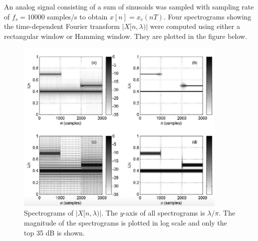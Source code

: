 \documentclass[12pt]{report}
\begin{document}
\newpage
{} 

An analog signal consisting of a sum of sinusoids was sampled with sampling rate of $f_s = 10000$ samples/s to obtain $x[n] = x_c(nT)$. Four spectrograms showing the time-dependent Fourier transform $|X[n, \lambda)|$ were computed using either a rectangular window or Hamming window. They are plotted in the figure below. 
\vspace{-0.3cm}
\begin{figure}[h!]
	\centering
	\includegraphics[width=0.9\textwidth]{figs/spectrograms.png}
	\caption{Spectrograms of $|X[n, \lambda)|$. The $y$-axis of all spectrograms is $\lambda/\pi$. The magnitude of the spectrograms is plotted in log scale and only the top 35 dB is shown.}
\end{figure}
\end{document}
